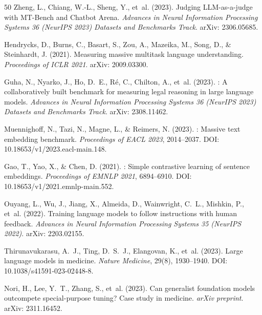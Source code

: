 \documentclass[11pt,a4paper]{article}
\begin{document}
\begin{thebibliography}{50}
Zheng, L., Chiang, W.-L., Sheng, Y., et~al. (2023).
\newblock Judging {LLM}-as-a-judge with {MT-Bench} and {Chatbot Arena}.
\newblock \emph{Advances in Neural Information Processing Systems 36
(NeurIPS 2023) Datasets and Benchmarks Track}.
\newblock arXiv: 2306.05685.

Hendrycks, D., Burns, C., Basart, S., Zou, A., Mazeika, M., Song, D.,
\& Steinhardt, J. (2021).
\newblock Measuring massive multitask language understanding.
\newblock \emph{Proceedings of ICLR 2021}.
\newblock arXiv: 2009.03300.

Guha, N., Nyarko, J., Ho, D.~E., R{\'e}, C., Chilton, A., et~al. (2023).
: A collaboratively built benchmark for measuring legal
reasoning in large language models.
\newblock \emph{Advances in Neural Information Processing Systems 36
(NeurIPS 2023) Datasets and Benchmarks Track}.
\newblock arXiv: 2308.11462.

Muennighoff, N., Tazi, N., Magne, L., \& Reimers, N. (2023).
: Massive text embedding benchmark.
\newblock \emph{Proceedings of EACL 2023}, 2014--2037.
\newblock DOI: 10.18653/v1/2023.eacl-main.148.

Gao, T., Yao, X., \& Chen, D. (2021).
: Simple contrastive learning of sentence embeddings.
\newblock \emph{Proceedings of EMNLP 2021}, 6894--6910.
\newblock DOI: 10.18653/v1/2021.emnlp-main.552.

Ouyang, L., Wu, J., Jiang, X., Almeida, D., Wainwright, C.~L.,
Mishkin, P., et~al. (2022).
\newblock Training language models to follow instructions with human feedback.
\newblock \emph{Advances in Neural Information Processing Systems 35
(NeurIPS 2022)}.
\newblock arXiv: 2203.02155.

Thirunavukarasu, A.~J., Ting, D.~S.~J., Elangovan, K., et~al. (2023).
\newblock Large language models in medicine.
\newblock \emph{Nature Medicine}, 29(8), 1930--1940.
\newblock DOI: 10.1038/s41591-023-02448-8.

Nori, H., Lee, Y.~T., Zhang, S., et~al. (2023).
\newblock Can generalist foundation models outcompete special-purpose tuning?
{C}ase study in medicine.
\newblock \emph{arXiv preprint}.
\newblock arXiv: 2311.16452.


\end{thebibliography}
\end{document}
